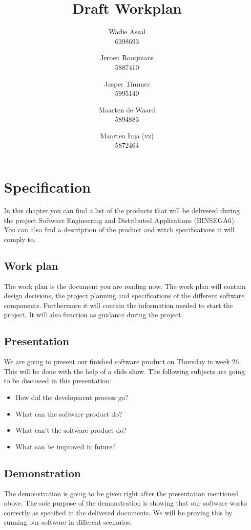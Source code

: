 \documentclass[a4paper, notitlepage]{article}
\title{Draft Workplan}
\author{Wadie Assal \\ 6398693 \and Jeroen Rooijmans \\ 5887410 \and Jasper Timmer \\ 5995140 \and Maarten de Waard \\ 5894883 \and Maarten Inja (vz) \\ 5872464}
\begin{document}
\maketitle


\section{Specification}
In this chapter you can find a list of the products that will be delivered
during the project Software Engineering and Distributed Applications (BINSEGA6). You can also find a description of the product and witch specifications it will comply to. 

\subsection{Work plan}
The work plan is the document you are reading now. The work plan will contain
design decisions, the project planning and specifications of the different
software components. Furthermore it will contain the information needed to start
the project. It will also function as guidance during the project. 

\subsection{Presentation}
We are going to present our finished software product on Thursday in week 26.
This will be done with the help of a slide show. The following subjects
are going to be discussed in this presentation:
\begin{itemize}
\item How did the development process go?
\item What can the software product do?
\item What can’t the software product do?
\item What can be improved in future?
\end{itemize}

\subsection{Demonstration}
The demonstration is going to be given right after the presentation mentioned
above. The sole purpose of the demonstration is showing that our software works
correctly as specified in the delivered documents. We will be proving this by
running our software in different scenarios.
\end{document}
